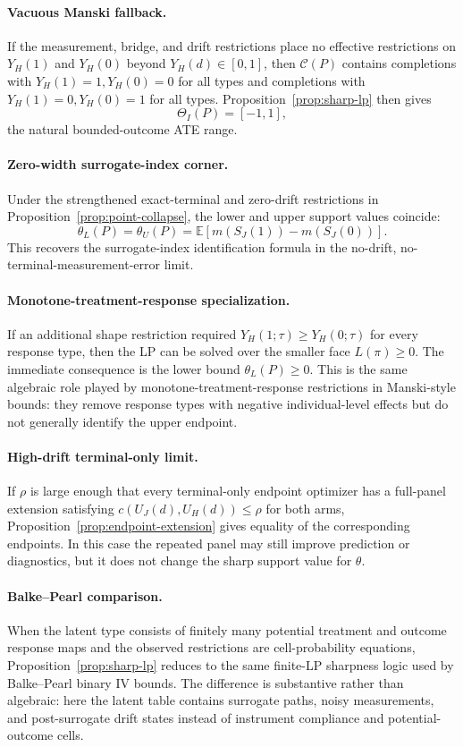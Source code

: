 \documentclass[11pt]{article}
\newcommand{\E}{\mathbb{E}}
\theoremstyle{definition}
\theoremstyle{plain}
\theoremstyle{remark}
\begin{document}
\paragraph{Vacuous Manski fallback.}
If the measurement, bridge, and drift restrictions place no effective restrictions on \(Y_H(1)\) and \(Y_H(0)\) beyond \(Y_H(d)\in[0,1]\), then \(\mathcal C(P)\) contains completions with \(Y_H(1)=1,Y_H(0)=0\) for all types and completions with \(Y_H(1)=0,Y_H(0)=1\) for all types.  Proposition~\ref{prop:sharp-lp} then gives
\[
  \Theta_I(P)=[-1,1],
\]
the natural bounded-outcome ATE range.

\paragraph{Zero-width surrogate-index corner.}
Under the strengthened exact-terminal and zero-drift restrictions in Proposition~\ref{prop:point-collapse}, the lower and upper support values coincide:
\[
  \theta_L(P)=\theta_U(P)=\E[m(S_J(1))-m(S_J(0))].
\]
This recovers the surrogate-index identification formula in the no-drift, no-terminal-measurement-error limit.

\paragraph{Monotone-treatment-response specialization.}
If an additional shape restriction required \(Y_H(1;\tau)\ge Y_H(0;\tau)\) for every response type, then the LP can be solved over the smaller face \(L(\pi)\ge0\).  The immediate consequence is the lower bound \(\theta_L(P)\ge0\).  This is the same algebraic role played by monotone-treatment-response restrictions in Manski-style bounds: they remove response types with negative individual-level effects but do not generally identify the upper endpoint.

\paragraph{High-drift terminal-only limit.}
If \(\rho\) is large enough that every terminal-only endpoint optimizer has a full-panel extension satisfying \(c(U_J(d),U_H(d))\le\rho\) for both arms, Proposition~\ref{prop:endpoint-extension} gives equality of the corresponding endpoints.  In this case the repeated panel may still improve prediction or diagnostics, but it does not change the sharp support value for \(\theta\).

\paragraph{Balke--Pearl comparison.}
When the latent type consists of finitely many potential treatment and outcome response maps and the observed restrictions are cell-probability equations, Proposition~\ref{prop:sharp-lp} reduces to the same finite-LP sharpness logic used by Balke--Pearl binary IV bounds.  The difference is substantive rather than algebraic: here the latent table contains surrogate paths, noisy measurements, and post-surrogate drift states instead of instrument compliance and potential-outcome cells.
\end{document}
